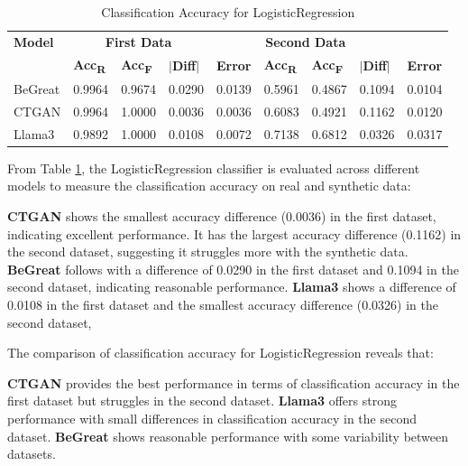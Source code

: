\begin{table}[H]
\centering
\caption{Classification Accuracy for LogisticRegression}
\label{tab:logistic_regression_accuracy_combined}
\begin{tabularx}{\textwidth}{l*{8}{X}}
    \toprule
    \textbf{Model} & \multicolumn{3}{c}{\textbf{First Data}} & \multicolumn{4}{c}{\textbf{Second Data}} \\
    \cmidrule(lr){2-4} \cmidrule(lr){5-8}
    & \textbf{Acc\textsubscript{R}} & \textbf{Acc\textsubscript{F}} & \textbf{$|$Diff$|$} & \textbf{Error} & \textbf{Acc\textsubscript{R}} & \textbf{Acc\textsubscript{F}} & \textbf{$|$Diff$|$} & \textbf{Error} \\
    \midrule
    BeGreat & 0.9964 & 0.9674 & 0.0290 & 0.0139 & 0.5961 & 0.4867 & 0.1094 & 0.0104 \\
    CTGAN & 0.9964 & 1.0000 & 0.0036 & 0.0036 & 0.6083 & 0.4921 & 0.1162 & 0.0120 \\
    Llama3 & 0.9892 & 1.0000 & 0.0108 & 0.0072 & 0.7138 & 0.6812 & 0.0326 & 0.0317 \\
    \bottomrule
\end{tabularx}
\end{table}



From Table \ref{tab:logistic_regression_accuracy_combined}, the LogisticRegression classifier is evaluated across different models to measure the classification accuracy on real and synthetic data:

\textbf{CTGAN} shows the smallest accuracy difference (0.0036) in the first dataset, indicating excellent performance. It has the largest accuracy difference (0.1162) in the second dataset, suggesting it struggles more with the synthetic data.
\textbf{BeGreat} follows with a difference of 0.0290 in the first dataset and 0.1094 in the second dataset, indicating reasonable performance.
\textbf{Llama3} shows a difference of 0.0108 in the first dataset and the smallest accuracy difference (0.0326) in the second dataset, 

\vspace{0.5cm}

The comparison of classification accuracy for LogisticRegression reveals that:

\textbf{CTGAN} provides the best performance in terms of classification accuracy in the first dataset but struggles in the second dataset.
\textbf{Llama3} offers strong performance with small differences in classification accuracy in the second dataset.
\textbf{BeGreat} shows reasonable performance with some variability between datasets.


